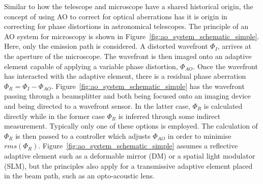 Similar to how the telescope and microscope have a shared historical origin,
the concept of using AO to correct for optical aberrations has it is 
origin in correcting for phase distortions in astronomical telescopes\cite{babcock1990adaptive}.
The principle of an AO system for microscopy is shown in 
Figure~\ref{fig:ao_system_schematic_simple}. Here, only the emission path 
is considered. A distorted wavefront $\Phi_{I}$, arrives at the aperture 
of the microscope. The wavefront is then imaged onto an adaptive element 
capable of applying a variable phase distortion, $\Phi_{AO}$. Once the 
wavefront has interacted with the adaptive element, there is a residual 
phase aberration $\Phi_{R} = \Phi_{I} - \Phi_{AO}$. 
Figure~\ref{fig:ao_system_schematic_simple} has the wavefront passing through
a beamsplitter and both being focused onto an imaging device and being 
directed to a wavefront sensor. In the latter case, $\Phi_{R}$ is 
calculated directly while in the former case $\Phi_{R}$ is inferred through 
some indirect measurement. Typically only one of these options is employed. 
The calculation of $\Phi_{R}$ is then passed to a controller which adjusts 
$\Phi_{AO}$ in order to minimise $rms(\Phi_{R})$. 
Figure~\ref{fig:ao_system_schematic_simple} assumes a reflective adaptive 
element such as a deformable mirror (DM) or a spatial light modulator (SLM), 
but the principles also apply for a transmissive adaptive element placed 
in the beam path, such as an opto-acoustic lens.

